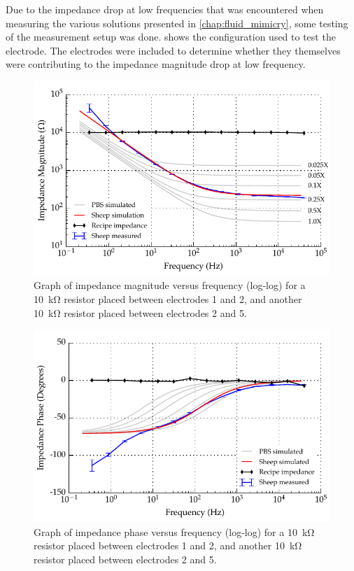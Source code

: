 Due to the impedance drop at low frequencies that was encountered when measuring the various solutions presented in \cref{chap:fluid_mimicry}, some testing of the measurement setup was done.
 shows the configuration used to test the electrode.
The electrodes were included to determine whether they themselves were contributing to the impedance magnitude drop at low frequency.


\begin{figure}
    \centering
    \includegraphics{content/appendices/Solution-Impedance-Measurements/graphics/run14_calibration_10k_noWater_ZVsF_graph_mag}
    \caption{\label{fig:calibration_10kRes_mag}Graph of impedance magnitude versus frequency (log-log) for a \SI{10}{\kilo\ohm} resistor placed between electrodes 1 and 2, and another \SI{10}{\kilo\ohm} resistor placed between electrodes 2 and 5.}
\end{figure}

\begin{figure}
    \centering
    \includegraphics{content/appendices/Solution-Impedance-Measurements/graphics/run14_calibration_10k_noWater_ZVsF_graph_phase}
    \caption{\label{fig:calibration_10kRes_phase}Graph of impedance phase versus frequency (log-log) for a \SI{10}{\kilo\ohm} resistor placed between electrodes 1 and 2, and another \SI{10}{\kilo\ohm} resistor placed between electrodes 2 and 5.}
\end{figure}

